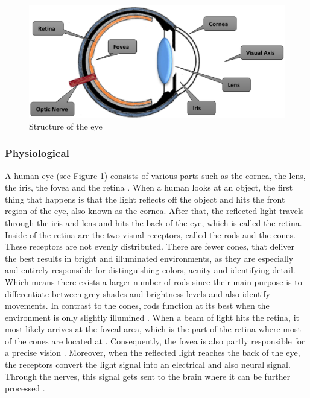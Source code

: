 \begin{figure}[!ht]
    \centering
    \includegraphics[width=0.75\linewidth]{images/Eye_djamasbi2014eye.png}
    \caption{
       Structure of the eye \autocite[38]{djamasbi2014eye}
    }
    \label{figure:Eye}
\end{figure}

\subsubsection{Physiological}
A human eye (see Figure \ref{figure:Eye}) consists of various parts such as the cornea, the lens, the iris, the fovea and the retina \autocite{djamasbi2014eye}. When a human looks at an object, the first thing that happens is that the light reflects off the object and hits the front region of the eye, also known as the cornea. After that, the reflected light travels through the iris and lens and hits the back of the eye, which is called the retina. Inside of the retina are the two visual receptors, called the rods and the cones. These receptors are not evenly distributed. There are fewer cones, that deliver the best results in bright and illuminated environments, as they are especially and entirely responsible for distinguishing colors, acuity and identifying detail. Which means there exists a larger number of rods since their main purpose is to differentiate between grey shades and brightness levels and also identify movements. In contrast to the cones, rods function at its best when the environment is only slightly illumined \autocite{djamasbi2014eye, biedert2010eyebook}.
When a beam of light hits the retina, it most likely arrives at the foveal area, which is the part of the retina where most of the cones are located at \autocite{djamasbi2014eye}. Consequently, the fovea is also partly responsible for a precise vision \autocite{biedert2010eyebook}.
Moreover, when the reflected light reaches the back of the eye, the receptors convert the light signal into an electrical and also neural signal. Through the nerves, this signal gets sent to the brain where it can be further processed \autocite{djamasbi2014eye}.

